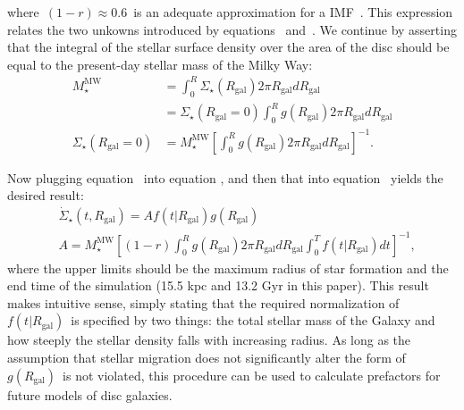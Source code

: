where~$(1 - r) \approx 0.6$~is an adequate approximation for a 
\citet{Kroupa2001} IMF~\citep[][see discussion in 
their~\S~2.2]{Weinberg2017b}. 
This expression relates the two unkowns introduced by 
equations~ and~. We continue 
by asserting that the integral of the stellar surface density over the area of 
the disc should be equal to the present-day stellar mass of the Milky Way: 
\begin{subequations}\begin{align} 
M_\star^\text{MW} &= \int_0^R \Sigma_\star(R_\text{gal}) 2\pi R_\text{gal} 
dR_\text{gal} 
\\ 
&= \Sigma_\star(R_\text{gal} = 0) \int_0^R g(R_\text{gal}) 2\pi R_\text{gal} 
dR_\text{gal} 
\\ 
\Sigma_\star(R_\text{gal} = 0) &= M_\star^\text{MW} \left[\int_0^R 
g(R_\text{gal}) 2\pi R_\text{gal}dR_\text{gal}\right]^{-1}. 
\label{migration:eq:intermediate_2} 
\end{align}\end{subequations} 
\par 
Now plugging equation~ into equation 
, and then that into equation~ 
yields the desired result: 
\begin{subequations}\begin{align} 
&\dot{\Sigma}_\star(t, R_\text{gal}) = Af(t|R_\text{gal})g(R_\text{gal}) 
\\ 
&A = M_\star^\text{MW}\left[(1 - r) \int_0^R g(R_\text{gal})2\pi R_\text{gal} 
dR_\text{gal} \int_0^T f(t|R_\text{gal})dt\right]^{-1}, 
\end{align}\end{subequations} 
where the upper limits should be the maximum radius of star formation and the 
end time of the simulation (15.5 kpc and 13.2 Gyr in this paper). This result 
makes intuitive sense, simply stating that the required normalization of 
$f(t|R_\text{gal})$~is specified by two things: the total stellar mass of the 
Galaxy and how steeply the stellar density falls with increasing radius. As 
long as the assumption that stellar migration does not significantly alter the 
form of~$g(R_\text{gal})$~is not violated, this procedure can be used to 
calculate prefactors for future models of disc galaxies. 

